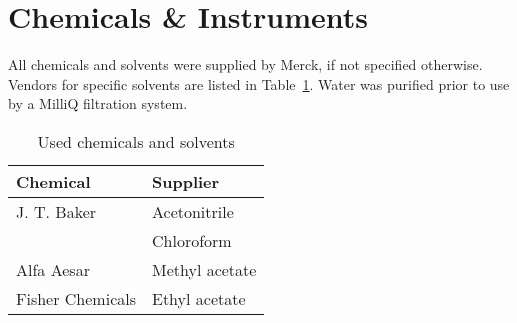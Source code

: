 
\section{Chemicals \& Instruments} %
\label{sec:chemicals_&_instruments}

	All chemicals and solvents were supplied by Merck, if not specified otherwise. Vendors for specific solvents are listed in Table~\ref{tab:solvent_table}. Water was purified prior to use by a MilliQ filtration system.

	\begin{table}[htbp]
		\caption{Used chemicals and solvents}
		\label{tab:solvent_table}
		\centering
		\begin{tabularx}{\textwidth}{XX}
			\toprule
			\textbf{Chemical}	&	\textbf{Supplier}	\\
			\midrule
			J. T. Baker			&	Acetonitrile		\\
								&	Chloroform			\\
			Alfa Aesar			&	Methyl acetate		\\
			Fisher Chemicals 	&	Ethyl acetate		\\
		\end{tabularx}
	\end{table}




